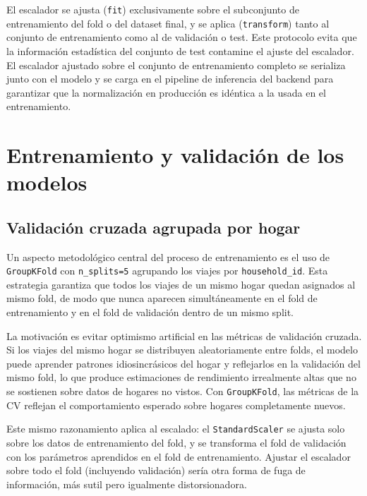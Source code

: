El escalador se ajusta (\texttt{fit}) exclusivamente sobre el subconjunto de entrenamiento del fold o del dataset final, y se aplica (\texttt{transform}) tanto al conjunto de entrenamiento como al de validación o test. Este protocolo evita que la información estadística del conjunto de test contamine el ajuste del escalador. El escalador ajustado sobre el conjunto de entrenamiento completo se serializa junto con el modelo y se carga en el pipeline de inferencia del backend para garantizar que la normalización en producción es idéntica a la usada en el entrenamiento.

\section{Entrenamiento y validación de los modelos}
\label{sec:impl_entrenamiento}

\subsection{Validación cruzada agrupada por hogar}

Un aspecto metodológico central del proceso de entrenamiento es el uso de \texttt{GroupKFold} con \texttt{n\_splits=5} agrupando los viajes por \texttt{household\_id}. Esta estrategia garantiza que todos los viajes de un mismo hogar quedan asignados al mismo fold, de modo que nunca aparecen simultáneamente en el fold de entrenamiento y en el fold de validación dentro de un mismo split.

La motivación es evitar optimismo artificial en las métricas de validación cruzada. Si los viajes del mismo hogar se distribuyen aleatoriamente entre folds, el modelo puede aprender patrones idiosincrásicos del hogar y reflejarlos en la validación del mismo fold, lo que produce estimaciones de rendimiento irrealmente altas que no se sostienen sobre datos de hogares no vistos. Con \texttt{GroupKFold}, las métricas de la CV reflejan el comportamiento esperado sobre hogares completamente nuevos.

Este mismo razonamiento aplica al escalado: el \texttt{StandardScaler} se ajusta solo sobre los datos de entrenamiento del fold, y se transforma el fold de validación con los parámetros aprendidos en el fold de entrenamiento. Ajustar el escalador sobre todo el fold (incluyendo validación) sería otra forma de fuga de información, más sutil pero igualmente distorsionadora.

